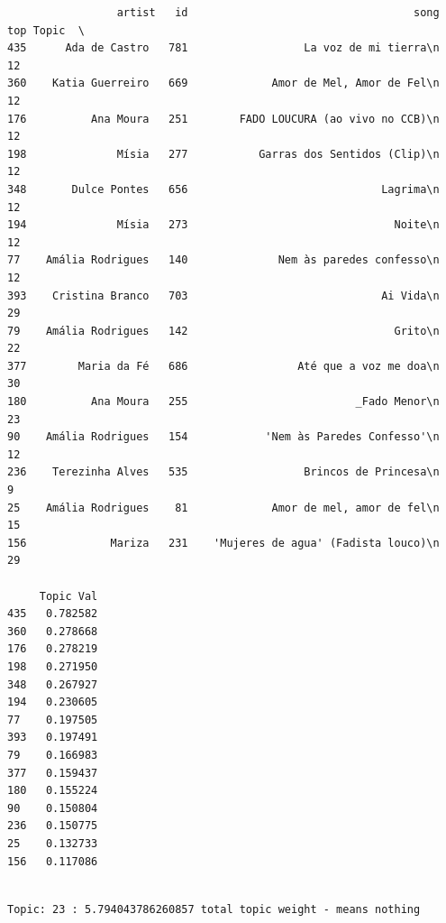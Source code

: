 \documentclass[11pt]{article}
\begin{document}
    
    \begin{verbatim}
                 artist   id                                   song top Topic  \
435      Ada de Castro   781                  La voz de mi tierra\n        12   
360    Katia Guerreiro   669             Amor de Mel, Amor de Fel\n        12   
176          Ana Moura   251        FADO LOUCURA (ao vivo no CCB)\n        12   
198              Mísia   277           Garras dos Sentidos (Clip)\n        12   
348       Dulce Pontes   656                              Lagrima\n        12   
194              Mísia   273                                Noite\n        12   
77    Amália Rodrigues   140              Nem às paredes confesso\n        12   
393    Cristina Branco   703                              Ai Vida\n        29   
79    Amália Rodrigues   142                                Grito\n        22   
377        Maria da Fé   686                 Até que a voz me doa\n        30   
180          Ana Moura   255                          _Fado Menor\n        23   
90    Amália Rodrigues   154            'Nem às Paredes Confesso'\n        12   
236    Terezinha Alves   535                  Brincos de Princesa\n         9   
25    Amália Rodrigues    81             Amor de mel, amor de fel\n        15   
156             Mariza   231    'Mujeres de agua' (Fadista louco)\n        29   

     Topic Val  
435   0.782582  
360   0.278668  
176   0.278219  
198   0.271950  
348   0.267927  
194   0.230605  
77    0.197505  
393   0.197491  
79    0.166983  
377   0.159437  
180   0.155224  
90    0.150804  
236   0.150775  
25    0.132733  
156   0.117086  
    \end{verbatim}

    
    \begin{Verbatim}[commandchars=\\\{\}]

Topic: 23 : 5.794043786260857 total topic weight - means nothing

    \end{Verbatim}
\end{document}
